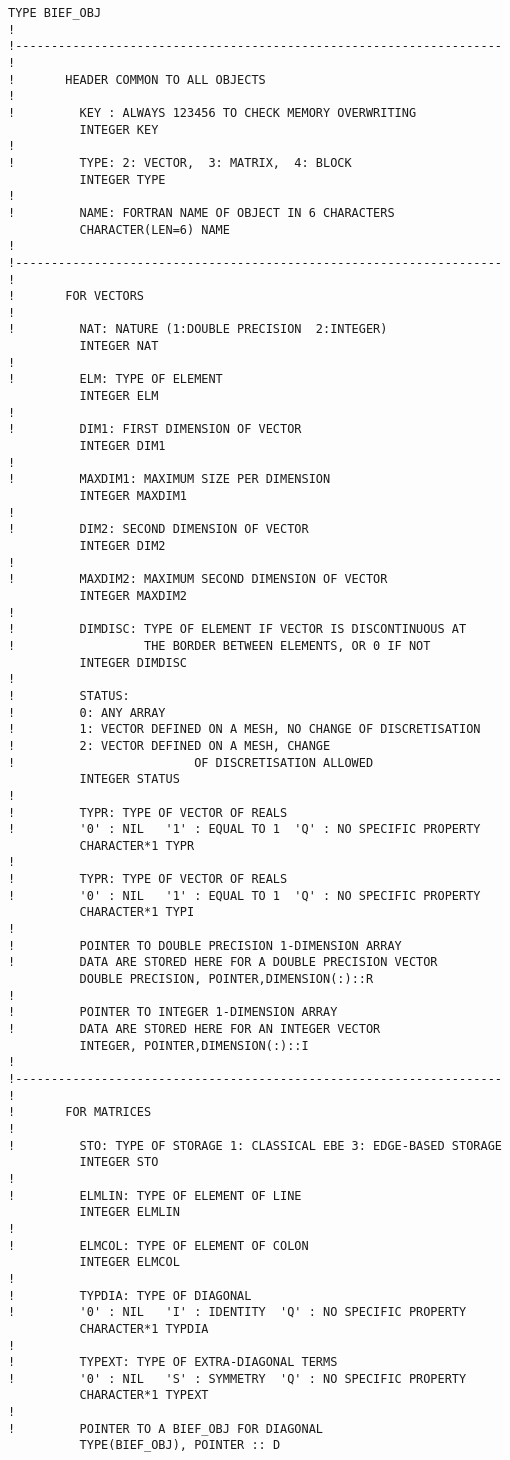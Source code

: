 \begin{lstlisting}[language=TelFortran]
        TYPE BIEF_OBJ
!
!--------------------------------------------------------------------
!
!       HEADER COMMON TO ALL OBJECTS
!
!         KEY : ALWAYS 123456 TO CHECK MEMORY OVERWRITING
          INTEGER KEY
!
!         TYPE: 2: VECTOR,  3: MATRIX,  4: BLOCK
          INTEGER TYPE
!
!         NAME: FORTRAN NAME OF OBJECT IN 6 CHARACTERS
          CHARACTER(LEN=6) NAME
!
!--------------------------------------------------------------------
!
!       FOR VECTORS
!
!         NAT: NATURE (1:DOUBLE PRECISION  2:INTEGER)
          INTEGER NAT
!
!         ELM: TYPE OF ELEMENT
          INTEGER ELM
!
!         DIM1: FIRST DIMENSION OF VECTOR
          INTEGER DIM1
!
!         MAXDIM1: MAXIMUM SIZE PER DIMENSION
          INTEGER MAXDIM1
!
!         DIM2: SECOND DIMENSION OF VECTOR
          INTEGER DIM2
!
!         MAXDIM2: MAXIMUM SECOND DIMENSION OF VECTOR
          INTEGER MAXDIM2
!
!         DIMDISC: TYPE OF ELEMENT IF VECTOR IS DISCONTINUOUS AT
!                  THE BORDER BETWEEN ELEMENTS, OR 0 IF NOT
          INTEGER DIMDISC
!
!         STATUS:
!         0: ANY ARRAY
!         1: VECTOR DEFINED ON A MESH, NO CHANGE OF DISCRETISATION
!         2: VECTOR DEFINED ON A MESH, CHANGE
!                         OF DISCRETISATION ALLOWED
          INTEGER STATUS
!
!         TYPR: TYPE OF VECTOR OF REALS
!         '0' : NIL   '1' : EQUAL TO 1  'Q' : NO SPECIFIC PROPERTY
          CHARACTER*1 TYPR
!
!         TYPR: TYPE OF VECTOR OF REALS
!         '0' : NIL   '1' : EQUAL TO 1  'Q' : NO SPECIFIC PROPERTY
          CHARACTER*1 TYPI
!
!         POINTER TO DOUBLE PRECISION 1-DIMENSION ARRAY
!         DATA ARE STORED HERE FOR A DOUBLE PRECISION VECTOR
          DOUBLE PRECISION, POINTER,DIMENSION(:)::R
!
!         POINTER TO INTEGER 1-DIMENSION ARRAY
!         DATA ARE STORED HERE FOR AN INTEGER VECTOR
          INTEGER, POINTER,DIMENSION(:)::I
!
!--------------------------------------------------------------------
!
!       FOR MATRICES
!
!         STO: TYPE OF STORAGE 1: CLASSICAL EBE 3: EDGE-BASED STORAGE
          INTEGER STO
!
!         ELMLIN: TYPE OF ELEMENT OF LINE
          INTEGER ELMLIN
!
!         ELMCOL: TYPE OF ELEMENT OF COLON
          INTEGER ELMCOL
!
!         TYPDIA: TYPE OF DIAGONAL
!         '0' : NIL   'I' : IDENTITY  'Q' : NO SPECIFIC PROPERTY
          CHARACTER*1 TYPDIA
!
!         TYPEXT: TYPE OF EXTRA-DIAGONAL TERMS
!         '0' : NIL   'S' : SYMMETRY  'Q' : NO SPECIFIC PROPERTY
          CHARACTER*1 TYPEXT
!
!         POINTER TO A BIEF_OBJ FOR DIAGONAL
          TYPE(BIEF_OBJ), POINTER :: D

\end{lstlisting}
